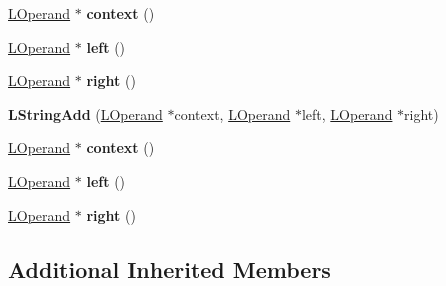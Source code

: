 \begin{DoxyCompactItemize}
\item 
\hyperlink{classv8_1_1internal_1_1_l_operand}{L\+Operand} $\ast$ {\bfseries context} ()\hypertarget{classv8_1_1internal_1_1_l_string_add_a607556e17316f1fd938b9e8731005f46}{}\label{classv8_1_1internal_1_1_l_string_add_a607556e17316f1fd938b9e8731005f46}

\item 
\hyperlink{classv8_1_1internal_1_1_l_operand}{L\+Operand} $\ast$ {\bfseries left} ()\hypertarget{classv8_1_1internal_1_1_l_string_add_a67ecfc808a49ae160114f0e53f366037}{}\label{classv8_1_1internal_1_1_l_string_add_a67ecfc808a49ae160114f0e53f366037}

\item 
\hyperlink{classv8_1_1internal_1_1_l_operand}{L\+Operand} $\ast$ {\bfseries right} ()\hypertarget{classv8_1_1internal_1_1_l_string_add_ae0c15e935d032468c5b8e4b12d3dd71f}{}\label{classv8_1_1internal_1_1_l_string_add_ae0c15e935d032468c5b8e4b12d3dd71f}

\item 
{\bfseries L\+String\+Add} (\hyperlink{classv8_1_1internal_1_1_l_operand}{L\+Operand} $\ast$context, \hyperlink{classv8_1_1internal_1_1_l_operand}{L\+Operand} $\ast$left, \hyperlink{classv8_1_1internal_1_1_l_operand}{L\+Operand} $\ast$right)\hypertarget{classv8_1_1internal_1_1_l_string_add_a8c7a0225dcb0347fca518802f8caa913}{}\label{classv8_1_1internal_1_1_l_string_add_a8c7a0225dcb0347fca518802f8caa913}

\item 
\hyperlink{classv8_1_1internal_1_1_l_operand}{L\+Operand} $\ast$ {\bfseries context} ()\hypertarget{classv8_1_1internal_1_1_l_string_add_a607556e17316f1fd938b9e8731005f46}{}\label{classv8_1_1internal_1_1_l_string_add_a607556e17316f1fd938b9e8731005f46}

\item 
\hyperlink{classv8_1_1internal_1_1_l_operand}{L\+Operand} $\ast$ {\bfseries left} ()\hypertarget{classv8_1_1internal_1_1_l_string_add_a67ecfc808a49ae160114f0e53f366037}{}\label{classv8_1_1internal_1_1_l_string_add_a67ecfc808a49ae160114f0e53f366037}

\item 
\hyperlink{classv8_1_1internal_1_1_l_operand}{L\+Operand} $\ast$ {\bfseries right} ()\hypertarget{classv8_1_1internal_1_1_l_string_add_ae0c15e935d032468c5b8e4b12d3dd71f}{}\label{classv8_1_1internal_1_1_l_string_add_ae0c15e935d032468c5b8e4b12d3dd71f}

\end{DoxyCompactItemize}
\subsection*{Additional Inherited Members}


